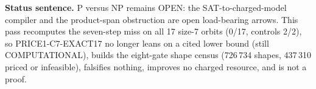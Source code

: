 \documentclass[11pt]{article}
\begin{document}
\bigskip
\noindent\textbf{Status sentence.} P versus NP remains OPEN: the SAT-to-charged-model compiler and the product-span obstruction are open load-bearing arrows. This pass recomputes the seven-step miss on all 17 size-7 orbits (0/17, controls 2/2), so PRICE1-C7-EXACT17 no longer leans on a cited lower bound (still COMPUTATIONAL), builds the eight-gate shape census (726\,734 shapes, 437\,310 priced or infeasible), falsifies nothing, improves no charged resource, and is not a proof.
\end{document}
